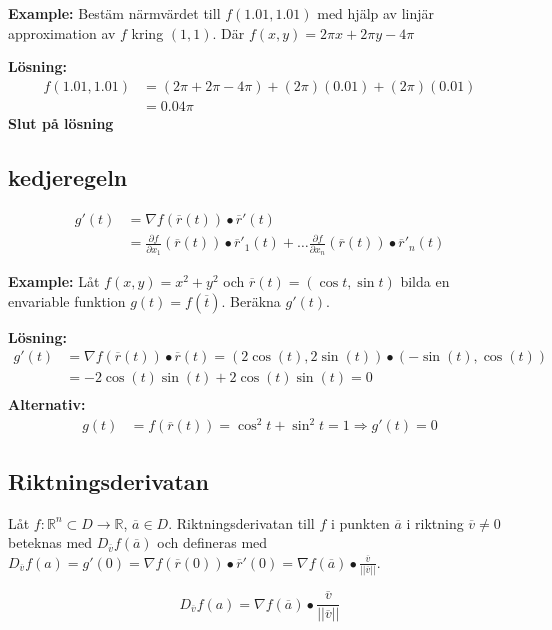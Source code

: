 \textbf{Example:}
Bestäm närmvärdet till $f(1.01, 1.01)$ med hjälp av linjär approximation av $f$
kring $(1,1)$. Där $f(x,y) = 2\pi x + 2\pi y -4\pi$

\textbf{Lösning:}
\begin{align*}
    f(1.01,1.01) &= (2\pi +2\pi -4\pi) +(2\pi)(0.01) +(2\pi)(0.01) \\
    &= 0.04\pi
\end{align*}
\textbf{Slut på lösning}


\subsection{kedjeregeln}
\begin{align*}
    g'(t) &= \nabla f(\overline{r}(t))\bullet\overline{r}'(t) \\
    &= \frac{\partial f}{\partial x_1}(\overline{r}(t))\bullet\overline{r}'_1(t) + \ldots \frac{\partial f}{\partial x_n}(\overline{r}(t))\bullet\overline{r}'_n(t)
\end{align*}

\textbf{Example:}
Låt $f(x,y)=x^2+y^2$ och $\overline{r}(t)=(\cos{t},\sin{t})$ bilda en envariable funktion
$g(t)=f(\overline{t})$. Beräkna $g'(t)$.

\textbf{Lösning:}
\begin{align*}
    g'(t) &= \nabla f(\overline{r}(t))\bullet\overline{r}(t) = (2\cos(t), 2\sin(t)) \bullet (-\sin(t), \cos(t)) \\
    &= -2\cos(t)\sin(t) + 2\cos(t)\sin(t) = 0 \\
\end{align*}
\textbf{Alternativ:}
\begin{align*}
    g(t) &= f(\overline{r}(t)) = \cos^2t + \sin^2t = 1 \Rightarrow g'(t) = 0
\end{align*}


\subsection{Riktningsderivatan}
Låt $f:\mathbb{R}^n\subset D\to\mathbb{R}$, $\overline{a}\in D$.
Riktningsderivatan till $f$ i punkten $\overline{a}$ i riktning $\overline{v}\neq0$
beteknas med $D_{\overline{v}}f(\overline{a})$ och defineras med 
$D_{\overline{v}}f(a)=g'(0)=\nabla f(\overline{r}(0))\bullet\overline{r}'(0) = \nabla f(\overline{a})\bullet\frac{\overline{v}}{||\overline{v}||}$.

\begin{equation*}
    D_{\overline{v}}f(a)= \nabla f(\overline{a})\bullet\frac{\overline{v}}{||\overline{v}||}
\end{equation*}

